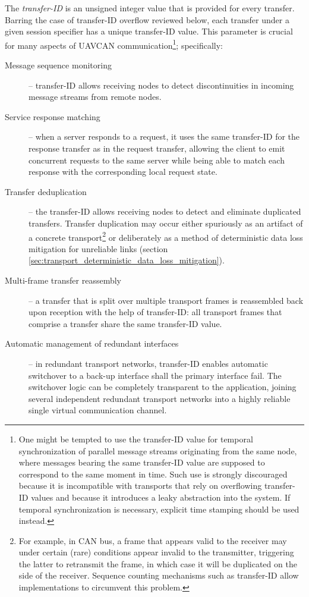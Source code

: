 The \emph{transfer-ID} is an unsigned integer value that is provided for every transfer.
Barring the case of transfer-ID overflow reviewed below,
each transfer under a given session specifier has a unique transfer-ID value.
This parameter is crucial for many aspects of UAVCAN communication\footnote{%
    One might be tempted to use the transfer-ID value for temporal synchronization of
    parallel message streams originating from the same node,
    where messages bearing the same transfer-ID value are supposed to correspond to the same moment in time.
    Such use is strongly discouraged because it is incompatible with transports that rely on overflowing
    transfer-ID values and because it introduces a leaky abstraction into the system.
    If temporal synchronization is necessary, explicit time stamping should be used instead.
}; specifically:

\begin{description}
    \item[Message sequence monitoring] -- transfer-ID allows receiving nodes to detect discontinuities
    in incoming message streams from remote nodes.

    \item[Service response matching] -- when a server responds to a request, it uses the same transfer-ID for the
    response transfer as in the request transfer,
    allowing the client to emit concurrent requests to the same server while being able to
    match each response with the corresponding local request state.

    \item[Transfer deduplication] -- the transfer-ID allows receiving nodes to detect and eliminate duplicated
    transfers.
    Transfer duplication may occur either spuriously as an artifact of a concrete transport\footnote{%
        For example, in CAN bus, a frame that appears valid to the receiver may under certain (rare) conditions
        appear invalid to the transmitter, triggering the latter to retransmit the frame,
        in which case it will be duplicated on the side of the receiver.
        Sequence counting mechanisms such as transfer-ID allow implementations to circumvent this problem.
    } or deliberately as a method of deterministic data loss mitigation for unreliable links
    (section \ref{sec:transport_deterministic_data_loss_mitigation}).

    \item[Multi-frame transfer reassembly] -- a transfer that is split over multiple transport frames is reassembled
    back upon reception with the help of transfer-ID: all transport frames that comprise a transfer
    share the same transfer-ID value.

    \item[Automatic management of redundant interfaces] -- in redundant transport networks,
    transfer-ID enables automatic switchover to a back-up interface shall the primary interface fail.
    The switchover logic can be completely transparent to the application, joining several independent
    redundant transport networks into a highly reliable single virtual communication channel.
\end{description}

